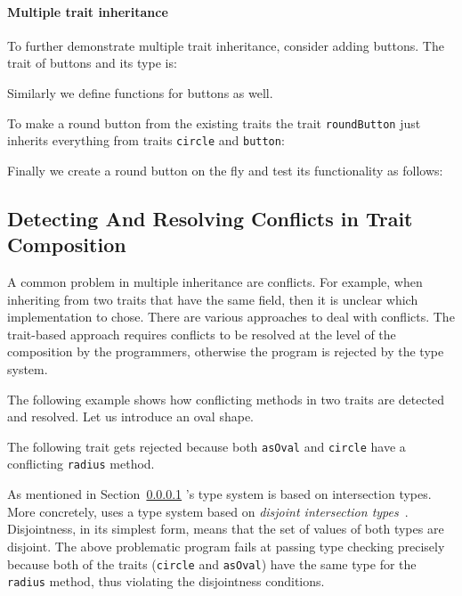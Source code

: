 \paragraph{Multiple trait inheritance} To further demonstrate multiple
trait inheritance, consider adding buttons. The trait of buttons and its type is:

Similarly we define functions for buttons as well.

\noindent To make a round button from the existing traits the trait \lstinline{roundButton} just inherits everything from
traits \lstinline{circle} and \lstinline{button}:

\noindent Finally we create a round button on the fly and test its functionality
as follows:

\subsection{Detecting And Resolving Conflicts in Trait Composition}
\label{sec:conflicts}

A common problem in multiple inheritance are conflicts. For example,
when inheriting from two traits that have the same field, then it is
unclear which implementation to chose. There are various approaches to
deal with conflicts. The trait-based approach requires conflicts to be
resolved at the level of the composition by the programmers, otherwise
the program is rejected by the type system. 

The following example
shows how conflicting methods in two traits are detected and resolved.
Let us introduce an oval shape.

The following trait gets rejected because both \lstinline{asOval} and
\lstinline{circle} have a conflicting \lstinline{radius} method.

\noindent As mentioned in Section~\ref{} \name's type system is based
on intersection types. More concretely, \name uses a type system based
on \emph{disjoint intersection types}~\cite{oliveira2016disjoint}. Disjointness, in its simplest
form, means that the set of values of both types are disjoint. The above
problematic program fails at passing type checking precisely because both of the
traits (\lstinline{circle} and \lstinline{asOval}) have the same type for the
\lstinline{radius} method, thus violating the disjointness conditions.

